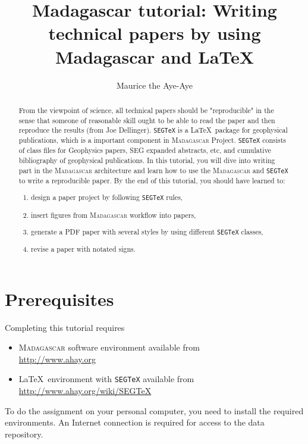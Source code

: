 \title{Madagascar tutorial: Writing technical papers by using Madagascar and LaTeX}

\author{Maurice the Aye-Aye\footnotemark[1]}

\address{
\footnotemark[1] King Julien's Royal Advisor, \\
Island of Madagascar, \\ Africa}


\maketitle

\begin{abstract}
From the viewpoint of science, all technical papers should be
"reproducible" in the sense that someone of reasonable skill ought to
be able to read the paper and then reproduce the results (from Joe
Dellinger). \texttt{SEGTeX} is a \LaTeX\ package for geophysical
publications, which is a important component in \textsc{Madagascar}
Project. \texttt{SEGTeX} consists of class files for Geophysics
papers, SEG expanded abstracts, etc, and cumulative bibliography of
geophysical publications. In this tutorial, you will dive into writing
part in the \textsc{Madagascar} architecture \cite[]{m8r} and learn
how to use the \textsc{Madagascar} and \texttt{SEGTeX} to write a
reproducible paper. By the end of this tutorial, you should have
learned to: 
\begin{enumerate} 
\item design a paper project by following \texttt{SEGTeX} rules,
\item insert figures from \textsc{Madagascar} workflow into papers, 
\item generate a PDF paper with several styles by using different 
\texttt{SEGTeX} classes,
\item revise a paper with notated signs.  
\end{enumerate}
\end{abstract}

\section{Prerequisites}

Completing this tutorial requires
\begin{itemize}
\item \textsc{Madagascar} software environment available from \\
\url{http://www.ahay.org}
\item \LaTeX\ environment with \texttt{SEGTeX} available from \\ 
\url{http://www.ahay.org/wiki/SEGTeX}
\end{itemize}
To do the assignment on your personal computer, you need to install
the required environments. An Internet connection is required for
access to the data repository.

